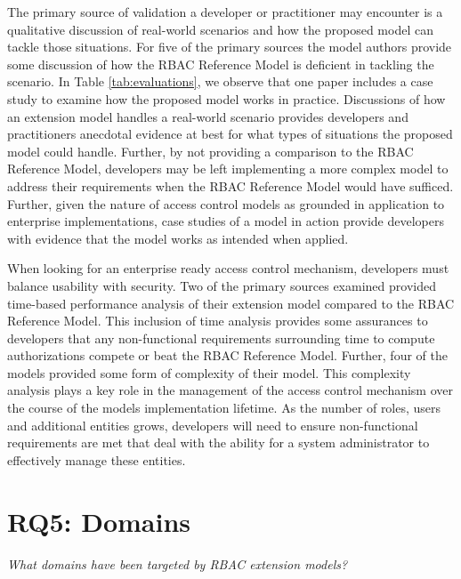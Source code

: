 The primary source of validation a developer or practitioner may encounter is a qualitative discussion of real-world
scenarios and how the proposed model can tackle those situations. 
For five of the primary sources \cite{bao08:role} \cite{zou2009crbac} \cite{zhang06:collaborative} \cite{zhao2008flexible} \cite{ray07:spatio} the model authors provide some discussion of how the RBAC Reference Model is deficient in tackling the scenario.
In Table \ref{tab:evaluations}, we observe that one paper includes a case study to examine how the proposed model works in practice. Discussions
of how an extension model handles a real-world scenario provides developers and practitioners anecdotal evidence at best
for what types of situations the proposed model could handle. Further, by not providing a comparison to the RBAC Reference Model, developers may be left implementing a more complex model to address their requirements when the RBAC Reference Model would
have sufficed.  Further, given the nature of access control models as grounded in application to enterprise implementations, 
case studies of a model in action provide developers with evidence that the model works as intended when applied.

When looking for an enterprise ready access control mechanism, developers must balance usability with security. 
Two of the primary sources examined provided time-based performance analysis of their extension model compared
to the RBAC Reference Model. This inclusion of time analysis provides some assurances to developers that any non-functional
requirements surrounding time to compute authorizations compete or beat the RBAC Reference Model. Further, four of the models provided
some form of complexity of their model. This complexity analysis plays a key role in the management of the access control mechanism
over the course of the models implementation lifetime. As the number of roles, users and additional entities grows, developers will 
need to ensure non-functional requirements are met that deal with the ability for a system administrator to effectively manage these
entities.



\section{RQ5: Domains} \label{sec:domains}

\textit{What domains have been targeted by RBAC extension models?}
\\

